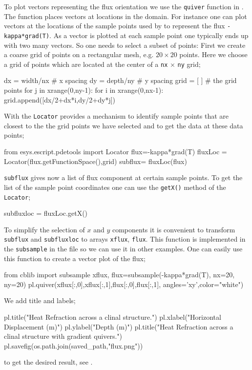 To plot vectors representing the flux orientation we use the 
\verb|quiver| function in \pylab. The function places vectors at locations in the domain.
For instance one can plot vectors at the locations of the sample points used by \esc 
to represent the flux \verb|-kappa*grad(T)|. As a vector is plotted at each sample point one typically ends
up with two many vectors. So one needs to select a subset of points:
First we create a coarse grid of points on a rectangular mesh, e.g. $20 \times 20$ points. Here we choose a grid of points which are located at the center of a \verb|nx| $\times$ \verb|ny| grid;
\begin{python}
dx = width/nx # x spacing
dy = depth/ny # y spacing
grid = [ ] # the grid points
for j in xrange(0,ny-1):
    for i in xrange(0,nx-1):
           grid.append([dx/2+dx*i,dy/2+dy*j])
\end{python}
With the \verb|Locator| \esc provides a mechanism to identify sample points that are closest 
to the the grid points we have selected and to get the data at these data points; 
\begin{python}
from esys.escript.pdetools import Locator
flux=-kappa*grad(T)
fluxLoc = Locator(flux.getFunctionSpace(),grid)
subflux= fluxLoc(flux) 
\end{python}
\verb|subflux| gives now a list of flux component at certain sample points. To get the 
list of the sample point coordinates one can use the \verb|getX()| method of the 
\verb|Locator|;
\begin{python}
subfluxloc = fluxLoc.getX()
\end{python}
To simplify the selection of $x$ and $y$ components it is convenient 
to transform \verb|subflux| and \verb|subfluxloc| to \numpy arrays
\verb|xflux|, \verb|flux|.
This function is implemented in the \verb|subsample| 
in the   file so we can use it in other examples. One can easily use this function 
to create a vector plot of the flux;
\begin{python}
from cblib import subsample
xflux, flux=subsample(-kappa*grad(T), nx=20, ny=20)
pl.quiver(xflux[:,0],xflux[:,1],flux[:,0],flux[:,1], angles='xy',color="white")
\end{python}
We add title and labels;
\begin{python}
pl.title("Heat Refraction across a clinal structure.")
pl.xlabel("Horizontal Displacement (m)")
pl.ylabel("Depth (m)")
pl.title("Heat Refraction across a clinal structure \n with gradient quivers.")
pl.savefig(os.path.join(saved_path,"flux.png"))
\end{python} 
to get the desired result, see .

